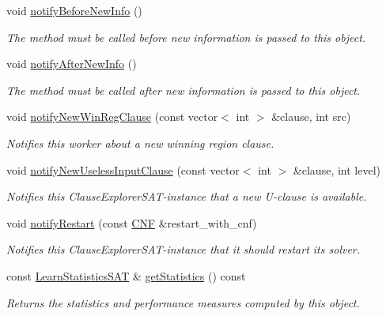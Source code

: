 \begin{DoxyCompactItemize}
void \hyperlink{classClauseExplorerSAT_a36134b9b6f662c44de73e76146c256bd}{notify\-Before\-New\-Info} ()
\begin{DoxyCompactList}\small\item\em The method must be called before new information is passed to this object. \end{DoxyCompactList}\item 
void \hyperlink{classClauseExplorerSAT_a8289e4ba9921717f705a1b2fb2655761}{notify\-After\-New\-Info} ()
\begin{DoxyCompactList}\small\item\em The method must be called after new information is passed to this object. \end{DoxyCompactList}\item 
void \hyperlink{classClauseExplorerSAT_ad507ce2b3b33e0e5b27237fd24954d82}{notify\-New\-Win\-Reg\-Clause} (const vector$<$ int $>$ \&clause, int src)
\begin{DoxyCompactList}\small\item\em Notifies this worker about a new winning region clause. \end{DoxyCompactList}\item 
void \hyperlink{classClauseExplorerSAT_a1898760d3aec582ffbd0c5dc5460f8f9}{notify\-New\-Useless\-Input\-Clause} (const vector$<$ int $>$ \&clause, int level)
\begin{DoxyCompactList}\small\item\em Notifies this Clause\-Explorer\-S\-A\-T-\/instance that a new U-\/clause is available. \end{DoxyCompactList}\item 
void \hyperlink{classClauseExplorerSAT_ab08aedd836a12bdc325da6e3b0f8b711}{notify\-Restart} (const \hyperlink{classCNF}{C\-N\-F} \&restart\-\_\-with\-\_\-cnf)
\begin{DoxyCompactList}\small\item\em Notifies this Clause\-Explorer\-S\-A\-T-\/instance that it should restart its solver. \end{DoxyCompactList}\item 
const \hyperlink{classLearnStatisticsSAT}{Learn\-Statistics\-S\-A\-T} \& \hyperlink{classClauseExplorerSAT_a9798ab0d723cc896feef36e2fbf5311a}{get\-Statistics} () const 
\begin{DoxyCompactList}\small\item\em Returns the statistics and performance measures computed by this object. \end{DoxyCompactList}\end{DoxyCompactItemize}
